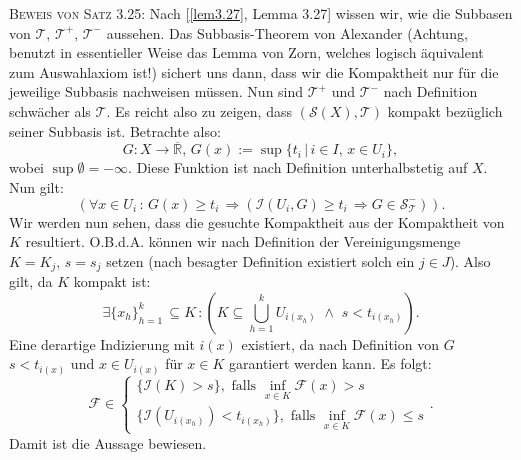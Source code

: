 \textsc{Beweis von Satz 3.25:} Nach [\ref{lem3.27}, Lemma 3.27] wissen wir, wie die Subbasen von \(\mathcal{T}, \, \mathcal{T}^+, \, \mathcal{T}^-\) aussehen. Das Subbasis-Theorem von Alexander (Achtung, benutzt in essentieller Weise das Lemma von Zorn, welches logisch äquivalent zum Auswahlaxiom ist!) sichert uns dann, dass wir die Kompaktheit nur für die jeweilige Subbasis nachweisen müssen. Nun sind \(\mathcal{T}^+\) und \(\mathcal{T}^-\) nach Definition schwächer als \(\mathcal{T}\). Es reicht also zu zeigen, dass \((\mathcal{S}(X),\mathcal{T})\) kompakt bezüglich seiner Subbasis ist. Betrachte also:
\begin{equation}
    G: X \to \overline{\mathbb{R}}, \, G(x) := \sup \{t_i \, | \, i \in I, \, x \in U_i\},
\end{equation}
wobei \(\sup \emptyset = - \infty\). Diese Funktion ist nach Definition unterhalbstetig auf \(X\). Nun gilt:
\begin{equation}
    (\forall x \in U_i \, : \, G(x) \geq t_i \, \Rightarrow (\mathcal{I}(U_i,G) \geq t_i \, \Rightarrow G \in \mathcal{S}_{\mathcal{T}}^-)).
\end{equation}
Wir werden nun sehen, dass die gesuchte Kompaktheit aus der Kompaktheit von \(K\) resultiert. O.B.d.A. können wir nach Definition der Vereinigungsmenge \(K=K_j, \, s = s_j\) setzen (nach besagter Definition existiert solch ein \(j \in J\)). Also gilt, da \(K\) kompakt ist:
\begin{equation}
    \exists \{x_h\}_{h=1}^k \, \subseteq K \, : (K \subseteq \bigcup_{h=1}^k U_{i(x_h)} \, \, \land \, \, s < t_{i(x_h)}).
\end{equation}
Eine derartige Indizierung mit \(i(x)\) existiert, da nach Definition von \(G\) \(s < t_{i(x)}\) und \(x \in U_{i(x)}\) für \(x \in K\) garantiert werden kann. Es folgt:
\begin{equation}
    \mathcal{F} \in \begin{cases}
        \{\mathcal{I}(K) > s\}, \text{ falls }\inf_{x \in K} \mathcal{F}(x) > s \\
        \{\mathcal{I}(U_{i(x_h)}) < t_{i(x_h)}\}, \text{ falls }\inf_{x \in K} \mathcal{F}(x) \leq s
    \end{cases}.
\end{equation}
Damit ist die Aussage bewiesen. \QEDB\\

